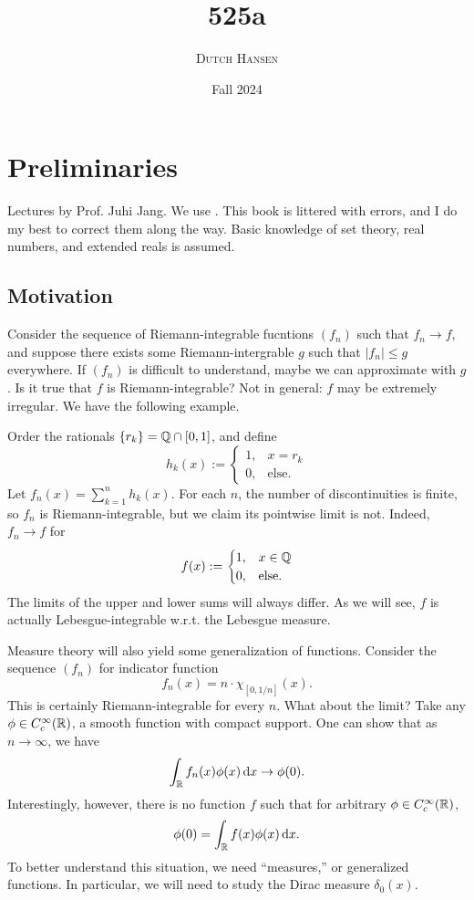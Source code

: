 \documentclass[12pt]{article} %
\title{525a}
\author{\textsc{Dutch Hansen}}
\date{\normalsize{Fall 2024}}
\begin{document}
\maketitle

\pagebreak

\tableofcontents

\pagebreak

\section{Preliminaries}

Lectures by Prof. Juhi Jang. We use \cite{folland1999real}. This book is littered with errors, and I do my best to correct them along the way. Basic knowledge of set theory, real numbers, and extended reals is assumed.

\subsection{Motivation}

\begin{example}
    Consider the sequence of Riemann-integrable fucntions $(f_n)$ such that $f_n \to f$, and suppose there exists some Riemann-intergrable $g$ such that $|f_n| \leq g$ everywhere. If $(f_n)$ is difficult to understand, maybe we can approximate with $g$. Is it true that $f$ is Riemann-integrable? Not in general: $f$ may be extremely irregular. We have the following example.

    Order the rationals $\{r_k\} = \mathbb{Q} \cap [0,1]$, and define \[h_k(x) := \begin{cases}
        1, &x = r_k\\
        0, &\text{else}.
    \end{cases}\] Let $f_n(x) = \sum_{k=1}^{n} h_k(x)$. For each $n$, the number of discontinuities is finite, so $f_n$ is Riemann-integrable, but we claim its pointwise limit is not. Indeed, $f_n \to f$ for \[f(x) := \begin{cases}
        1, &x \in \mathbb{Q}\\
        0, &\text{else}.
    \end{cases}\] The limits of the upper and lower sums will always differ. As we will see, $f$ is actually Lebesgue-integrable w.r.t. the Lebesgue measure.
\end{example}

\begin{example}
    Measure theory will also yield some generalization of functions. Consider the sequence $(f_n)$ for indicator function \[f_n(x) = n \cdot \chi_{[0, 1/n]}(x).\] This is certainly Riemann-integrable for every $n$. What about the limit? Take any $\phi \in C_c^{\infty}(\mathbb{R})$, a smooth function with compact support. One can show that as $n \to \infty$, we have \[\int_{\mathbb{R}} f_n(x) \phi(x) \, \mathrm{d} x \to \phi(0).\] Interestingly, however, there is no function $f$ such that for arbitrary $\phi \in C_c^{\infty}(\mathbb{R})$, \[\phi(0) = \int_{\mathbb{R}} f(x) \phi(x) \, \mathrm{d} x.\] To better understand this situation, we need ``measures,'' or generalized functions. In particular, we will need to study the Dirac measure $\delta_0(x)$.
\end{example}
\end{document}

